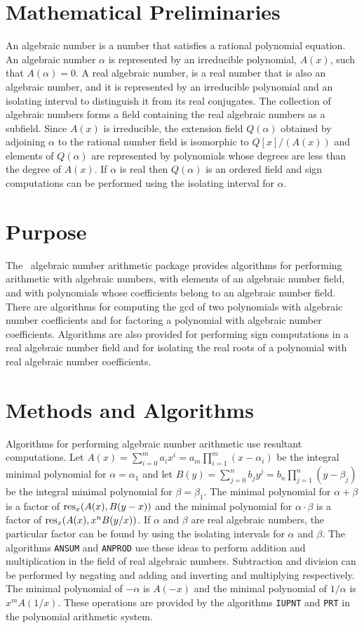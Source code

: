 \section{Mathematical Preliminaries}

An algebraic number is a number that satisfies a rational polynomial
equation.  An algebraic number $\alpha$ is represented by an irreducible
polynomial, $A(x)$, such that $A(\alpha) = 0$.
A real algebraic number,
is a real number that is also an algebraic number, and it is represented
by an irreducible polynomial and an isolating interval to distinguish
it from its real conjugates.
The collection of algebraic numbers forms a field
containing the real algebraic numbers as a subfield.
Since $A(x)$ is irreducible, the extension field $Q(\alpha)$ obtained 
by adjoining $\alpha$ to the rational number field is isomorphic to
$Q[x]/(A(x))$ and elements of $Q(\alpha)$ are represented by polynomials
whose degrees are less than the degree of $A(x)$.  If $\alpha$ is real then
$Q(\alpha)$ is an ordered field and sign computations can be performed
using the isolating interval for $\alpha$.

\section{Purpose}

The \saclib\ algebraic number arithmetic package provides algorithms
for performing arithmetic with algebraic numbers, with
elements of an algebraic
number field, and with polynomials whose coefficients belong to an algebraic 
number field.  There are algorithms for computing the gcd of two
polynomials with algebraic number coefficients and for factoring a polynomial
with algebraic number coefficients.
Algorithms are also provided for performing sign computations 
in a real algebraic number field and for isolating the real roots of a 
polynomial with real algebraic number coefficients. 

\section{Methods and Algorithms}
Algorithms for performing algebraic number arithmetic use
resultant computations.
Let $A(x) = \sum_{i=0}^ma_ix^i = a_m \prod_{i=1}^m(x-\alpha_i)$
be the integral minimal polynomial for $\alpha = \alpha_1$ and 
let $B(y) = \sum_{j=0}^n b_jy^j = b_n \prod_{j=1}^n (y - \beta_j)$ 
be the integral minimal
polynomial for $\beta = \beta_1$.  The minimal polynomial for
$\alpha + \beta$ is a factor of ${\rm res}_x(A(x),B(y-x))$ and the minimal polynomial
for $\alpha \cdot \beta$ is a factor of ${\rm res}_x(A(x),x^nB(y/x))$.  If
$\alpha$ and $\beta$ are real algebraic numbers, the particular factor
can be found by using the isolating intervals for $\alpha$ and $\beta$.  The
algorithms {\tt ANSUM} and {\tt ANPROD} use these ideas to perform addition
and multiplication in the field of real algebraic numbers.  Subtraction
and division can be performed by negating and adding and inverting and
multiplying respectively.  The minimal polynomial of
$-\alpha$ is $A(-x)$ and the minimal polynomial of $1/\alpha$ is
$x^mA(1/x)$.  These operations are provided by the algorithms 
{\tt IUPNT} and {\tt PRT} in the polynomial arithmetic system.

